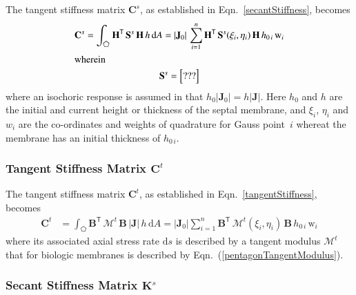 The tangent stiffness matrix $\mathbf{C}^s$, as established in Eqn.~\eqref{secantStiffness}, becomes 
\begin{subequations}
	\begin{gather}
		\mathbf{C}^s = \int_{\pentagon} \mathbf{H}^{\mathsf{T}} \,  \mathbf{S}^s \, \mathbf{H} \, h \, \mathrm{d} A
		=  | \mathbf{J}_0 |  \, \sum_{i=1}^{n} \mathbf{H}^{\mathsf{T}} \, \mathbf{S}^s (\xi_i , \eta_i) \, \mathbf{H} \, h_{0\,i} \, \mathrm{w}_i \\
        \intertext{wherein}
        \mathbf{S}^s = \begin{bmatrix}
        ???
        \end{bmatrix}
	\end{gather}
\end{subequations}
where an isochoric response is assumed in that $h_0 | \mathbf{J}_0 | = h | \mathbf{J} |$. Here $h_0$ and $h$ are the initial and current height or thickness of the septal membrane, and $\xi_i$, $\eta_i$ and $w_i$ are the co-ordinates and weights of quadrature for Gauss point~$i$ whereat the membrane has an initial thickness of $h_{0\,i}$. 

\subsubsection{Tangent Stiffness Matrix $\mathbf{C}^t$}

The tangent stiffness matrix $\mathbf{C}^t$, as established in Eqn.~\eqref{tangentStiffness}, becomes
\begin{equation}
	\begin{aligned}
		\mathbf{C}^t & =\int_{\pentagon} \mathbf{B}^{\mathsf{T}} \,  \boldsymbol{\mathcal{M}}^t \, \mathbf{B} \, |\mathbf{J}|  \, h \,  \mathrm{d} A
		= |\mathbf{J}_0| \sum_{i=1}^{n}   \mathbf{B}^{\mathsf{T}} \, \boldsymbol{\mathcal{M}}^t (\xi_i, \eta_i) \, \mathbf{B} \, h_{0\,i} \, \mathrm{w}_i 
	\end{aligned}
\end{equation} 
where its associated axial stress rate $\mathrm{d} s$ is described by a tangent modulus $\boldsymbol{\mathcal{M}}^{t}$ that for biologic membranes is described by Eqn.~(\ref{pentagonTangentModulus}).

\subsubsection{Secant Stiffness Matrix $\mathbf{K}^s$}

